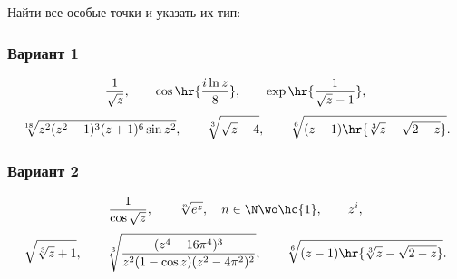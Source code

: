 \documentclass[a4paper]{article}
\begin{document}
Найти все особые точки и указать их тип:

\subsubsection{Вариант 1}

$$\frac{1}{\sqrt{z}},\qquad \cos\hr{\frac{i\ln z}{8}}, \qquad \exp\hr{\frac{1}{\sqrt z - 1}},$$
$$\sqrt[18]{z^2(z^2-1)^3(z+1)^6\sin z^2},\qquad \sqrt[3]{\sqrt z - 4},\qquad \sqrt[6]{(z-1)\hr{\sqrt[3]{z} - \sqrt{2-z}}}.$$

\subsubsection{Вариант 2}

$$\frac{1}{\cos\sqrt z},\qquad \sqrt[n]{e^z}, \quad n \in \N \wo \hc{1},\qquad z^i,$$
$$\sqrt{\sqrt[3]{z} + 1},\qquad  \sqrt[3]{\frac{(z^4-16\pi^4)^3}{z^2(1-\cos z)(z^2-4\pi^2)^2}},\qquad  \sqrt[6]{(z-1)\hr{\sqrt[3]{z} - \sqrt{2-z}}}.$$

\medskip
\dmvntrail
\end{document}
